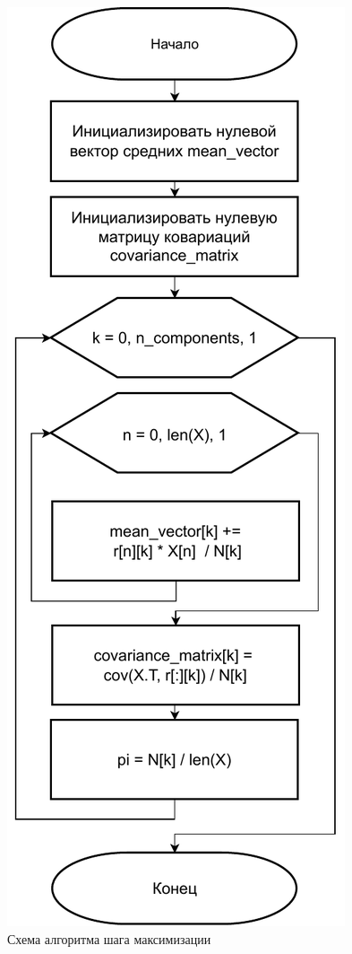 \begin{figure}[H]
	\centering
	\includegraphics[scale=1]{img/M-step.pdf}
	\caption{Схема алгоритма шага максимизации}
	\label{M-step}
\end{figure}

